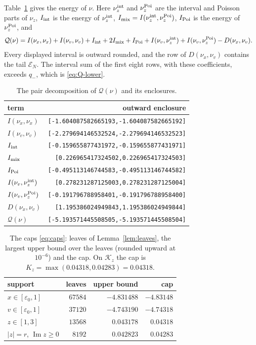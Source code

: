 \documentclass{amsart}
\numberwithin{equation}{section}
\numberwithin{table}{section}
\newcommand{\Kz}{0.04318}
\newcommand{\Kzcirc}{0.04283}
\begin{document}
Table~\ref{tab:energy} gives the energy of $\nu$. Here $\nu_z^{\rm int}$ and
$\nu_z^{\rm Poi}$ are the interval and Poisson parts of $\nu_z$, $I_{\rm int}$ is the
energy of $\nu_z^{\rm int}$, $I_{\rm mix}=I(\nu_z^{\rm int},\nu_z^{\rm Poi})$, $I_{\rm Poi}$ is the
energy of $\nu_z^{\rm Poi}$, and
\[
 \mathcal Q(\nu)=I(\nu_x,\nu_x)+I(\nu_v,\nu_v)+I_{\rm int}+2I_{\rm mix}+I_{\rm Poi}
 +I(\nu_v,\nu_z^{\rm int})+I(\nu_v,\nu_z^{\rm Poi})-D(\nu_x,\nu_v).
\]
Every displayed interval is outward rounded, and the row of $D(\nu_x,\nu_v)$
contains the tail $\mathcal E_N$. The interval sum of the first eight rows,
with these coefficients, exceeds $q_-$, which is \eqref{eq:Q-lower}.
\begin{table}[!ht]
\centering\small\renewcommand{\arraystretch}{1.14}\setlength{\tabcolsep}{5pt}
\caption{The pair decomposition of $\mathcal Q(\nu)$ and its enclosures.}
\label{tab:energy}
\begin{tabular}{@{}lr@{}}
\hline term & outward enclosure\\\hline
$I(\nu_x,\nu_x)$ & \texttt{[-1.604087582665193,-1.604087582665192]}\\
$I(\nu_v,\nu_v)$ & \texttt{[-2.279694146532524,-2.279694146532523]}\\
$I_{\rm int}$ & \texttt{[-0.159655877431972,-0.159655877431971]}\\
$I_{\rm mix}$ & \texttt{[0.226965417324502,0.226965417324503]}\\
$I_{\rm Poi}$ & \texttt{[-0.495113146744583,-0.495113146744582]}\\
$I(\nu_v,\nu_z^{\rm int})$ & \texttt{[0.278231287125003,0.278231287125004]}\\
$I(\nu_v,\nu_z^{\rm Poi})$ & \texttt{[-0.191796788958401,-0.191796788958400]}\\
$D(\nu_x,\nu_v)$ & \texttt{[1.195386024949843,1.195386024949844]}\\
$\mathcal Q(\nu)$ & \texttt{[-5.193571445508505,-5.193571445508504]}\\
\hline
\end{tabular}
\end{table}

\begin{table}[!ht]
\centering\small\renewcommand{\arraystretch}{1.14}\setlength{\tabcolsep}{5pt}
\caption{The caps \eqref{eq:caps}: leaves of Lemma~\ref{lem:leaves}, the
largest upper bound over the leaves (rounded upward at $10^{-6}$) and the
cap. On $\mathcal K_z$ the cap is $K_z=\max(\Kz,\Kzcirc)=\Kz$.}
\label{tab:caps}
\begin{tabular}{@{}lrrr@{}}
\hline
support&leaves&upper bound&cap\\
\hline
$x\in[\varepsilon_0,1]$ & $67584$ & $-4.831488$ & $-4.83148$\\
$v\in[\varepsilon_0,1]$ & $37120$ & $-4.743190$ & $-4.74318$\\
$z\in[1,3]$ & $13568$ & $0.043178$ & $0.04318$\\
$|z|=r$, $\operatorname{Im}z\ge0$ & $8192$ & $0.042823$ & $0.04283$\\
\hline
\end{tabular}
\end{table}
\end{document}
